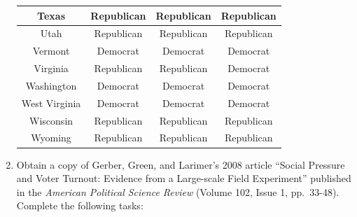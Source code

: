 \documentclass[]{book}
\theoremstyle{definition}
\theoremstyle{definition}
\theoremstyle{definition}
\theoremstyle{remark}
\begin{document}
\begin{enumerate}
\begin{table}[!h]
\begin{tabular}[t]{c|c|c|c}
  \hline
  Texas & Republican & Republican & Republican\\
  \hline
  Utah & Republican & Republican & Republican\\
  \hline
  Vermont & Democrat & Democrat & Democrat\\
  \hline
  Virginia & Republican & Republican & Democrat\\
  \hline
  Washington & Democrat & Democrat & Democrat\\
  \hline
  West Virginia & Democrat & Democrat & Democrat\\
  \hline
  Wisconsin & Republican & Republican & Republican\\
  \hline
  Wyoming & Republican & Republican & Republican\\
  \hline
  \end{tabular}
  \end{table}

\item
  Obtain a copy of Gerber, Green, and Larimer's 2008 article ``Social
  Pressure and Voter Turnout: Evidence from a Large-scale Field
  Experiment'' published in the \emph{American Political Science Review}
  (Volume 102, Issue 1, pp.~33-48). Complete the following tasks:


\end{enumerate}
\end{document}
